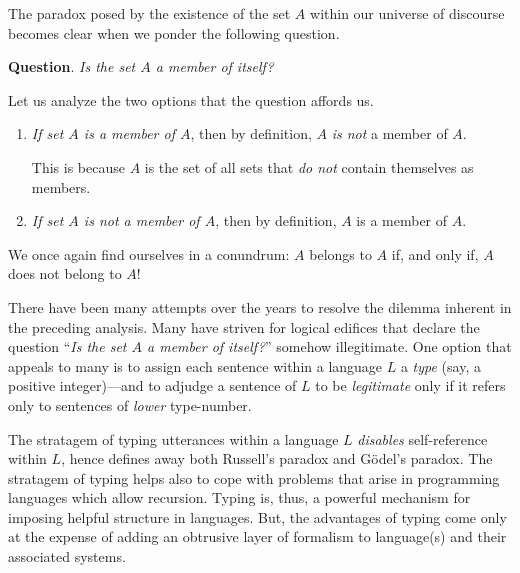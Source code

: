\bigskip

The paradox posed by the existence of the set $A$ within our universe of discourse becomes clear when we ponder the following question.

\medskip

\noindent
{\bf Question}.  {\it Is the set $A$ a member of itself?}

\smallskip

\noindent
Let us analyze the two options that the question affords us.
\begin{enumerate}
\item
{\em If set $A$ is a member of $A$}, then by definition, $A$ {\em is not} a member of $A$.

\smallskip

This is because $A$ is the set of all sets that {\em do not} contain themselves as members.

\medskip\item
{\em If set $A$ is {\em not} a member of $A$}, then by definition, $A$ is a member of $A$.
\end{enumerate}

\medskip

We once again find ourselves in a conundrum: $A$ belongs to $A$ if, and only if, $A$ does not belong to $A$!

\bigskip

There have been many attempts over the years to resolve the dilemma inherent in the preceding analysis.  Many have striven for logical edifices that declare the question ``{\it Is the set $A$ a member of itself?}'' somehow illegitimate.  One option that appeals to many is to assign each sentence within a language $L$ a {\it type} (say, a positive integer)---and to adjudge a sentence of $L$ to be {\em legitimate} only if it refers only to sentences of {\em lower} type-number.

\bigskip

The stratagem of typing utterances within a language $L$ {\em disables} self-reference within $L$, hence defines away both Russell's paradox and G\"{o}del's paradox.  The stratagem of typing helps also to cope with problems that arise in programming languages which allow recursion.  Typing is, thus, a powerful mechanism for imposing helpful structure in languages.  But, the advantages of typing come only at the expense of adding an obtrusive layer of formalism to language(s) and their associated systems.



